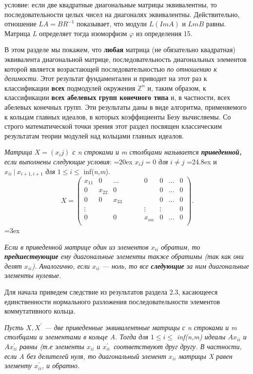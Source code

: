 \noindent условие: если две квадратные диагональные матрицы эквивалентны, то последовательности целых чисел на диагоналях эквивалентны. Действительно, отношение $L A = B R^{-1}$ показывает, что модули $L(Im A)$ и $Lm B$ равны. Матрица \textit{L} определяет тогда изоморфизм $\varphi$ из определения 15.

В этом разделе мы покажем, что \textbf{любая} матрица (не обязательно квадратная) эквивалента диагональной матрице, последовательность диагональных элементов которой является возрастающей последовательностью \textit{по отношению к делимости}. Этот результат фундаментален и приводит на этот раз к классификации \textbf{всех} подмодулей окружения $\mathbb{Z}^n$ и, таким образом, к классификации \textbf{всех абелевых групп конечного типа} и, в частности, всех абелевых конечных групп. Эти результаты даны в виде алгоритма, применяемого к кольцам главных идеалов, в которых коэффициенты Безу вычисляемы. Со строго математической точки зрения этот раздел посвящен классическим результатам теории модулей над кольцами главных идеалов.
\begin{determ}
\hspace*{0.5cm}

\textit{ Матрица $X = (x_ij)$ с n строками и m столбцами называется \textbf{приведенной,} если выполнены следующие условия}:
\parindent=20ex
$x_ij = 0$ \textit{для} $i \ne j$
\parindent=24.8ex
и $x_{ii} ~| ~ x_{i+1, i+1}$ \textit{для} $ 1 \leqslant i \leqslant $ inf(\textit{n,m}). \\
\[ X= \begin{pmatrix}
x_{11} & 0 & \dots & & & & 0 & 0 & \dots & 0\\
0 & x_{22} & 0 & & & & & 0 & \dots & 0 \\
0 & 0 & x_{33} & & & & & 0 & \dots & 0 \\
\vdots & & & & & & \vdots & \vdots & & 0 \\
0 & & 0 & & & & x_{nn} & 0 & \dots & 0 \\
\end{pmatrix}. 
\] 
\parindent=3ex

\textit{Если в приведенной матрице один из элементов $x_{ii}$ обратим, то \textbf{предшествующие} ему диагональные элементы также обратимы (так как они делят $x_{ii}$). Аналогично, если $x_{ii}$ — ноль, то все \textbf{следующие} за ним диагональные элементы нулевые.}
\end{determ}
Для начала приведем следствие из результатов раздела 2.3, касающееся единственности нормального разложения последовательности элементов коммутативного кольца.
\begin{sled}
\hspace*{0.5cm}
\textit{Пусть $X, X^{'}$ — две приведенные эквивалентные матрицы с n строками и m столбцами и элементами в кольце A. Тогда для $ 1 \leqslant i \leqslant $ inf(\textit{n,m}) идеалы $Ax_{ii}$ и $Ax^{'}_{ii}$ равны (т.е элементы $x_{ii}$ и $x^{'}_{ii} $~соответствуют друг другу. В частности, если A без делителей нуля, то диагональный элемент $x_{ii}$ матрицы X равен элементу $x^{'}_{ii}$, и обратно.}\\\\\\
\end{sled}

